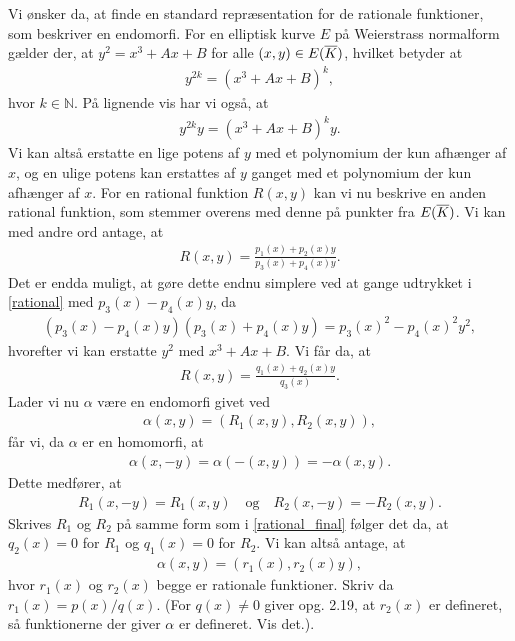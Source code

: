 Vi ønsker da, at finde en standard repræsentation for de rationale funktioner, som
beskriver en endomorfi. For en elliptisk kurve $E$ på Weierstrass normalform gælder
der, at $y^2 = x^3 + Ax + B$ for alle $(x, y) \in E(\overline{K})$, hvilket betyder at
\begin{align*}
	y^{2k} = (x^3 + Ax + B)^k,
\end{align*}
hvor $k \in \mathbb{N}$. På lignende vis har vi også, at 
\begin{align*}
	y^{2k} y = (x^3 + Ax + B)^k y.
\end{align*}
Vi kan altså erstatte en lige potens af $y$ med et polynomium der kun afhænger af $x$, og en ulige potens kan erstattes af $y$ ganget med et polynomium der kun afhænger af $x$.
For en rational funktion $R(x, y)$ kan vi nu beskrive en anden rational funktion,
som stemmer overens med denne på punkter fra $E(\overline{K})$. Vi kan med andre ord antage,
at 
\begin{align}
	\label{rational}
	R(x, y) = \frac{p_1(x) + p_2(x)y}{p_3(x)+p_4(x)y}.
\end{align}
Det er endda muligt, at gøre dette endnu simplere ved at gange udtrykket i \eqref{rational}
med $p_3(x)-p_4(x)y$, da 
\begin{align*}
	(p_3(x) - p_4(x)y)(p_3(x)+p_4(x)y) = p_3(x)^2 - p_4(x)^2 y^2,
\end{align*}
hvorefter vi kan erstatte $y^2$ med $x^3+Ax+B$. Vi får da, at 
\begin{align}
	\label{rational_final}
	R(x, y) = \frac{q_1(x) + q_2(x)y}{q_3(x)}.
\end{align}
Lader vi nu $\alpha$ være en endomorfi givet ved
\begin{align*}
	\alpha(x, y) = (R_1(x, y), R_2(x, y)),
\end{align*}
får vi, da $\alpha$ er en homomorfi, at 
\begin{align*}
	\alpha(x, -y) = \alpha(-(x, y)) =  -\alpha(x, y).
\end{align*}
Dette medfører, at 
\begin{align*}
	R_1(x, -y) = R_1(x, y) \quad \text{og} \quad R_2(x, -y) = -R_2(x, y).
\end{align*}
Skrives $R_1$ og $R_2$ på samme form som i \eqref{rational_final} følger det da, at 
$q_2(x)=0$ for $R_1$ og $q_1(x)=0$ for $R_2$. Vi kan altså antage, at 
\begin{align*}
	\alpha(x, y) = (r_1(x), r_2(x)y),
\end{align*}
hvor $r_1(x)$ og $r_2(x)$ begge er rationale funktioner. Skriv da $r_1(x)=p(x)/q(x)$. (For $q(x) \neq 0$ giver opg. 2.19, at $r_2(x)$ er defineret, så funktionerne der giver $\alpha$ er defineret. Vis det.).

